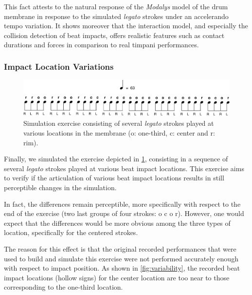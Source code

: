 This fact attests to the natural response of the \emph{Modalys} model of the drum membrane in response to the simulated \emph{legato} strokes under an accelerando tempo variation. It shows moreover that the interaction model, and especially the collision detection of beat impacts, offers realistic features such as contact durations and forces in comparison to real timpani performances.


			\subsubsection{Impact Location Variations}
			\label{subsubsec:Music_Evaluation_Extrapolation_ImpactVariations}

\begin{figure}%
	\begin{center}
		\includegraphics[width=130mm]{Chapters/6/Pics/Pdf/exo7-1.pdf}
	\end{center}
	\vspace{-0.5cm}
	\caption[Simulated exercises: extrapolation of impact location variations]{Simulation exercise consisting of several \emph{legato} strokes played at various locations in the membrane (o: one-third, c: center and r: rim).}
	\label{fig:exo7-1}
\end{figure}

Finally, we simulated the exercise depicted in \myfigname \ref{fig:exo7-1}, consisting in a sequence of several \emph{legato} strokes played at various beat impact locations. This exercise aims to verify if the articulation of various beat impact locations results in still perceptible changes in the simulation.

In fact, the differences remain perceptible, more specifically with respect to the end of the exercise (two last groups of four strokes: o c o r). However, one would expect that the differences would be more obvious among the three types of location, specifically for the centered strokes. 

The reason for this effect is that the original recorded performances that were used to build and simulate this exercise were not performed accurately enough with respect to impact position. As shown in \myfigname \ref{fig:variability}, the recorded beat impact locations (hollow signs) for the center location are too near to those corresponding to the one-third location.

